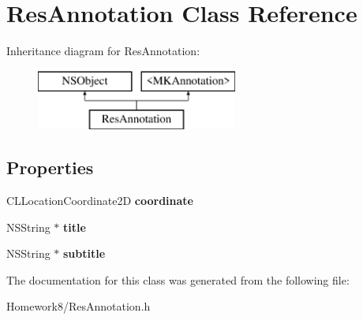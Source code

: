 \hypertarget{interface_res_annotation}{}\section{Res\+Annotation Class Reference}
\label{interface_res_annotation}
Inheritance diagram for Res\+Annotation\+:\begin{figure}[H]
\begin{center}
\leavevmode
\includegraphics[height=2.000000cm]{interface_res_annotation}
\end{center}
\end{figure}
\subsection*{Properties}
\begin{DoxyCompactItemize}
\item 
\mbox{\label{interface_res_annotation_af3510c3c75b05b25e15d94a5a07b289f}} 
C\+L\+Location\+Coordinate2D {\bfseries coordinate}
\item 
\mbox{\label{interface_res_annotation_aa8e6337d913abfebf2e67b5569fd9c89}} 
N\+S\+String $\ast$ {\bfseries title}
\item 
\mbox{\label{interface_res_annotation_a51cff184d1d0f94f4f51e889acd4a25b}} 
N\+S\+String $\ast$ {\bfseries subtitle}
\end{DoxyCompactItemize}


The documentation for this class was generated from the following file\+:\begin{DoxyCompactItemize}
\item 
Homework8/Res\+Annotation.\+h\end{DoxyCompactItemize}
